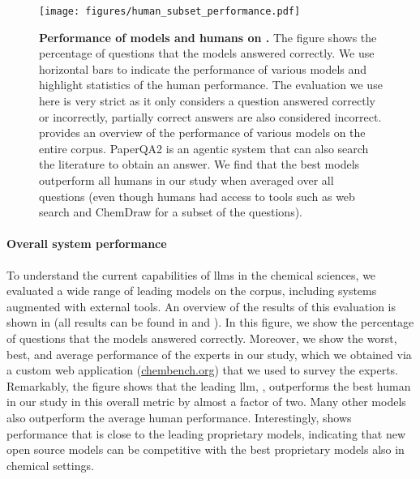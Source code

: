 \documentclass[11pt, oneside]{article}
\begin{document}
\begin{refsection}
\begin{figure}[!h]
    \centering
    \texttt{[image: figures/human\_subset\_performance.pdf]}
    \caption{\textbf{Performance of models and humans on \chembenchmini.} The figure shows the percentage of questions that the models answered correctly. We use horizontal bars to indicate the performance of various models and highlight statistics of the human performance.
    The evaluation we use here is very strict as it only considers a question answered correctly or incorrectly, partially correct answers are also considered incorrect.
     provides an overview of the performance of various models on the entire corpus.
    PaperQA2\autocite{skarlinski2024language} is an agentic system that can also search the literature to obtain an answer. We find that the best models outperform all humans in our study when averaged over all questions (even though humans had access to tools such as web search and ChemDraw for a subset of the questions).
    }
    \label{fig:human_vs_models_bar}
\end{figure}

\paragraph{Overall system performance}
To understand the current capabilities of \glspl{llm} in the chemical sciences, we evaluated a wide range of leading models\autocite{Huggingface} on the \chembench corpus, including systems augmented with external tools.
An overview of the results of this evaluation is shown in  (all results can be found in  and ).
In this figure, we show the percentage of questions that the models answered correctly.
Moreover, we show the worst, best, and average performance of the experts in our study, which we obtained via a custom web application (\url{chembench.org}) that we used to survey the experts.
Remarkably, the figure shows that the leading \gls{llm}, \oone, outperforms the best human in our study in this overall metric by almost a factor of two.
Many other models also outperform the average human performance.
Interestingly, \LlamaThreeOneFourZeroFiveBInstruct shows performance that is close to the leading proprietary models, indicating that new open source models can be competitive with the best proprietary models also in chemical settings.


\end{refsection}
\end{document}
